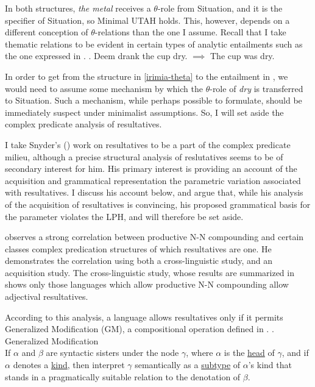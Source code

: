 \documentclass[MilwayThesis]{subfiles}
\begin{document}
In both structures, \textit{the metal} receives a $\theta$-role from Situation, and it is the specifier of Situation, so Minimal UTAH holds.
This, however, depends on a different conception of $\theta$-relations than the one I assume.
Recall that I take thematic relations to be evident in certain types of analytic entailments such as the one expressed in \Next.
\ex. Deem drank the cup dry. $\implies$ The cup was dry.

In order to get from the structure in \ref{irimia-theta} to the entailment in \Last, we would need to assume some mechanism by which the $\theta$-role of \textit{dry} is transferred to Situation.
Such a mechanism, while perhaps possible to formulate, should be immediately suspect under minimalist assumptions.
So, I will set aside the complex predicate analysis of resultatives.

I take Snyder's (\citeyear{snyder1995language,snyder2001nature,snyder2012parameter}) work on resultatives to be a part of the complex predicate milieu, although a precise structural analysis of reslutatives seems to be of secondary interest for him.
His primary interest is providing an account of the acquisition and grammatical representation the parametric variation associated with resultatives.
I discuss his account below, and argue that, while his analysis of the acquisition of resultatives is convincing, his proposed grammatical basis for the parameter violates the LPH, and will therefore be set aside.

\textcite{snyder1995language,snyder2001nature} observes a strong correlation between productive N-N compounding and certain classes complex predication structures of which resultatives are one.
He demonstrates the correlation using both a cross-linguistic study, and an acquisition study.
The cross-linguistic study, whose results are summarized in  shows only those languages which allow productive N-N compounding allow adjectival resultatives.


According to this analysis, a language allows resultatives only if it permits Generalized Modification (GM), a compositional operation defined in \Next.
\ex. Generalized Modification \parencite{snyder2012parameter}\\
If $\alpha$ and $\beta$ are syntactic sisters under the node $\gamma$, where $\alpha$ is the \uline{head} of $\gamma$, and if $\alpha$ denotes a \uline{kind}, then interpret $\gamma$ semantically as a \uline{subtype} of $\alpha$'s kind that stands in a pragmatically suitable relation to the denotation of $\beta$.
\end{document}
